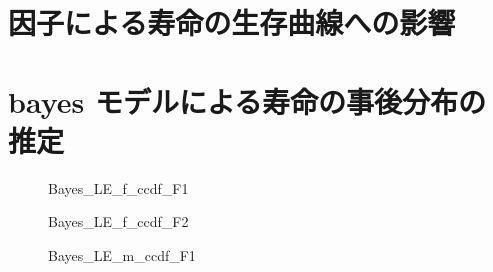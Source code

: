 \documentclass[a4j,11pt,mc]{jreport}
\begin{document}
\section{因子による寿命の生存曲線への影響}

\section{bayes モデルによる寿命の事後分布の推定}
	\begin{figure}[H]
		\begin{center}
				\caption{Bayes\_LE\_f\_ccdf\_F1}
		\end{center}
	\end{figure}


	\begin{figure}[H]
		\begin{center}
				\caption{Bayes\_LE\_f\_ccdf\_F2}
		\end{center}
	\end{figure}



	\begin{figure}[H]
		\begin{center}
				\caption{Bayes\_LE\_m\_ccdf\_F1}
		\end{center}
	\end{figure}
\end{document}
